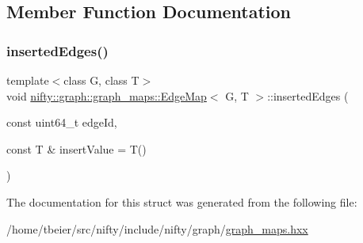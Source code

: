 \subsection{Member Function Documentation}
\mbox{\label{structnifty_1_1graph_1_1graph__maps_1_1EdgeMap_aa658ff2e5952fce8342349a159425bbd}} 
\subsubsection{\texorpdfstring{inserted\+Edges()}{insertedEdges()}}
{\footnotesize\ttfamily template$<$class G, class T$>$ \\
void \hyperlink{structnifty_1_1graph_1_1graph__maps_1_1EdgeMap}{nifty\+::graph\+::graph\+\_\+maps\+::\+Edge\+Map}$<$ G, T $>$\+::inserted\+Edges (\begin{DoxyParamCaption}\item[{const uint64\+\_\+t}]{edge\+Id,  }\item[{const T \&}]{insert\+Value = {\ttfamily T()} }\end{DoxyParamCaption})\hspace{0.3cm}{\ttfamily [inline]}}



The documentation for this struct was generated from the following file\+:\begin{DoxyCompactItemize}
\item 
/home/tbeier/src/nifty/include/nifty/graph/\hyperlink{graph__maps_8hxx}{graph\+\_\+maps.\+hxx}\end{DoxyCompactItemize}
